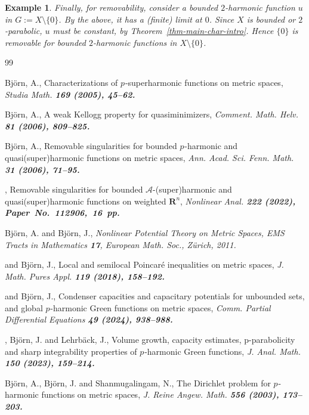 \documentclass[a4paper,twoside]{article}
\newcommand{\art}[6]{{\sc #1, \rm #2, \it #3 \bf #4 \rm (#5), \mbox{#6}.}}
\newcommand{\auth}[2]{{#1, #2.}}
\newcommand{\book}[3]{{\sc #1, \it #2, \rm #3.}}
\newcommand{\AND}{{\rm and }}
\theoremstyle{propositional}
\theoremstyle{descriptive}
\newtheorem{example}[thm]{Example}
\theoremstyle{remarkstyle}
\newcommand{\setm}{\setminus}
\newcommand{\p}{{$p\mspace{1mu}$}}
\newcommand{\R}{\mathbf{R}}
\newcommand{\A}{\ensuremath{\mathcal{A}}}%
\numberwithin{equation}{section}
\begin{document}
\begin{example}
Finally, for removability, consider a bounded $2$-harmonic 
function $u$ in $G:= X\setm\{0\}$.  By the above, it has a (finite)
limit at $0$.  Since $X$ is bounded or $2$-parabolic, 
$u$ must be constant, by Theorem~\ref{thm-main-char-intro}.
Hence $\{0\}$ is removable for bounded $2$-harmonic functions in 
$X\setm\{0\}$.
\end{example}


\begin{thebibliography}{99}

 \art{Bj\"orn, A.}
        {Characterizations of \p-superharmonic
         functions on metric spaces}
        {Studia Math.} {169} {2005} {45--62}

 \art{Bj\"orn, A.}
        {A weak Kellogg property for quasiminimizers}
        {Comment. Math. Helv.} {81} {2006} {809--825}

 \art{Bj\"orn, A.}
        {Removable singularities for bounded \p-harmonic
          and quasi\-(super)\-harmonic functions on metric spaces}
        {Ann. Acad. Sci. Fenn. Math.} {31} {2006} {71--95}

 \art{\auth{Bj\"orn}{A}}
        {Removable singularities for bounded \A-(super)harmonic 
          and   quasi(super)harmonic  functions   on weighted $\R^n$}
        {Nonlinear Anal.} {222} {2022} {Paper No. 112906, 16 pp}

 \book{Bj\"orn, A. \AND Bj\"orn, J.}
        {\it Nonlinear Potential Theory on Metric Spaces}
    {EMS Tracts in Mathematics {\bf 17},
        European Math. Soc., Z\"urich, 2011}

 \art{\auth{Bj\"orn}{A} \AND \auth{Bj\"orn}{J}}	
        {Local and semilocal Poincar\'e inequalities on metric spaces}
        {J. Math. Pures Appl.} {119} {2018} {158--192}

 \art{\auth{Bj\"orn}{A} \AND \auth{Bj\"orn}{J}}
      {Condenser capacities and capacitary potentials 
        for unbounded sets, and global \p-harmonic Green functions on metric spaces}
        {Comm. Partial Differential Equations} {49} {2024} {938--988}

 \art{\auth{Bj\"orn}{A}, \auth{Bj\"orn}{J}
	\AND \auth{Lehrb\"ack}{J}}
        {Volume growth, capacity estimates, p-parabolicity and sharp 
        integrability properties of \p-harmonic Green functions}
        {J. Anal. Math.}{150}{2023}{159--214}

 \art{Bj\"orn, A., Bj\"orn, J. \AND Shanmugalingam, N.}
        {The Dirichlet problem for \p-harmonic functions on metric spaces}
        {J. Reine Angew. Math.} {556} {2003} {173--203}


\end{thebibliography}
\end{document}
